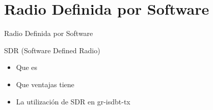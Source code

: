 \section{Radio Definida por Software}


\begin{frame}{Radio Definida por Software}
\begin{block}{SDR (Software Defined Radio)}
	\begin{itemize}
		\item {	Que es }
		\item { Que ventajas tiene }
		\item { La utilización de SDR en gr-isdbt-tx}
	\end{itemize}
\end{block}
\end{frame}


